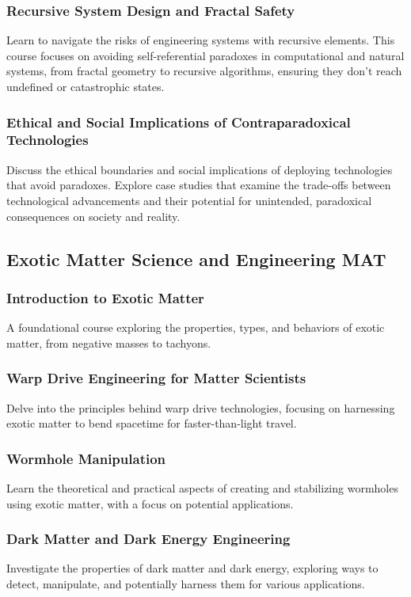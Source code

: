 \subsubsection{Recursive System Design and Fractal Safety}
Learn to navigate the risks of engineering systems with recursive elements. This course focuses on avoiding self-referential paradoxes in computational and natural systems, from fractal geometry to recursive algorithms, ensuring they don't reach undefined or catastrophic states.
\subsubsection{Ethical and Social Implications of Contraparadoxical Technologies}
Discuss the ethical boundaries and social implications of deploying technologies that avoid paradoxes. Explore case studies that examine the trade-offs between technological advancements and their potential for unintended, paradoxical consequences on society and reality.


\subsection{Exotic Matter Science and Engineering \hfill MAT}
\subsubsection{Introduction to Exotic Matter}
A foundational course exploring the properties, types, and behaviors of exotic matter, from negative masses to tachyons.
\subsubsection{Warp Drive Engineering for Matter Scientists}
Delve into the principles behind warp drive technologies, focusing on harnessing exotic matter to bend spacetime for faster-than-light travel.
\subsubsection{Wormhole Manipulation}
Learn the theoretical and practical aspects of creating and stabilizing wormholes using exotic matter, with a focus on potential applications.
\subsubsection{Dark Matter and Dark Energy Engineering}
Investigate the properties of dark matter and dark energy, exploring ways to detect, manipulate, and potentially harness them for various applications.
